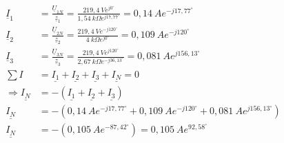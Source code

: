 \begin{enumerate}[label=\alph*)]
	\begin{align*}
		\underline{I}_{1} &= \frac{\underline{U}_{1N}}{\underline{z}_{1}} = 
    	\frac{219,4\ Ve^{j0^\circ}}{1,54\ k\Omega e^{j17,77^\circ}}=0,14\ Ae^{-j17,77^\circ}\\ 
 		\underline{I}_{2} &= \frac{\underline{U}_{2N}}{\underline{z}_{2}} = 
    	\frac{219,4\ Ve^{-j120^\circ}}{4\ k\Omega e^{j0^\circ}}=0,109\ Ae^{-j120^\circ}\\ 
		\underline{I}_{3} &= \frac{\underline{U}_{3N}}{\underline{z}_{3}} = 
    	\frac{219,4\ Ve^{j120^\circ}}{2,67\ k\Omega e^{-j36,13^\circ}}=0,081\ Ae^{j156,13^\circ}\\
		\sum I &= \underline{I_1}+\underline{I_2}+\underline{I_3}+\underline{I_N}=0\\
		\Rightarrow \underline{I_N}&=-(\underline{I_1}+\underline{I_2}+\underline{I_3})\\
    	\underline{I_N} &= -(0,14\ Ae^{-j17,77^\circ}+0,109\ Ae^{-j120^\circ}+0,081\ Ae^{j156,13^\circ})\\ 
    	\underline{I_N} &= -(0,105\ Ae^{-87,42^\circ})=0,105\ Ae^{92,58^\circ}
  \end{align*}


\end{enumerate}
